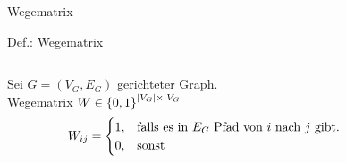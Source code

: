 \begin{frame}{Wegematrix}
	\begin{block}{Def.: Wegematrix}
		\begin{columns}
			\begin{column}{0.95\textwidth}
				Sei $G=(V_G,E_G)$ gerichteter Graph.\\
				Wegematrix $W \in \left\{ 0,1 \right\}^{\mid V_G \mid \times \mid V_G \mid}$\\[12pt]
				\[
					W_{ij} = 
					\begin{cases}
						1, & \parbox[t]{.6\textwidth}{ falls es in $E_G$ Pfad von $i$ nach $j$ gibt.}\\
						0, & \parbox[t]{.6\textwidth}{ sonst}
					\end{cases}
				\]
			\end{column}
		\end{columns}
	\end{block}
\end{frame}

